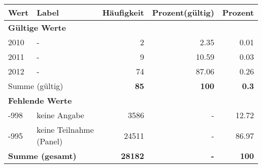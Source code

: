      \begin{longtable}{lXrrr}
     \toprule
     \textbf{Wert} & \textbf{Label} & \textbf{Häufigkeit} & \textbf{Prozent(gültig)} & \textbf{Prozent} \\
     \endhead
     \midrule
     \multicolumn{5}{l}{\textbf{Gültige Werte}}\\

     2010 &
     \multicolumn{1}{X}{ -  } &


       \num{2} &
       \num[round-mode=places,round-precision=2]{2,35} &
         \num[round-mode=places,round-precision=2]{0,01} \\

     2011 &
     \multicolumn{1}{X}{ -  } &


       \num{9} &
       \num[round-mode=places,round-precision=2]{10,59} &
         \num[round-mode=places,round-precision=2]{0,03} \\

     2012 &
     \multicolumn{1}{X}{ -  } &


       \num{74} &
       \num[round-mode=places,round-precision=2]{87,06} &
         \num[round-mode=places,round-precision=2]{0,26} \\
     \midrule
     \multicolumn{2}{l}{Summe (gültig)} &
       \textbf{\num{85}} &
     \textbf{100} &
       \textbf{\num[round-mode=places,round-precision=2]{0,3}} \\
     \multicolumn{5}{l}{\textbf{Fehlende Werte}}\\
       -998 &
       keine Angabe &
         \num{3586} &
        - &
         \num[round-mode=places,round-precision=2]{12,72} \\
       -995 &
       keine Teilnahme (Panel) &
         \num{24511} &
        - &
         \num[round-mode=places,round-precision=2]{86,97} \\
     \midrule
     \multicolumn{2}{l}{\textbf{Summe (gesamt)}} &
          \textbf{\num{28182}} &
        \textbf{-} &
        \textbf{100} \\
     \bottomrule
     \end{longtable}
     
